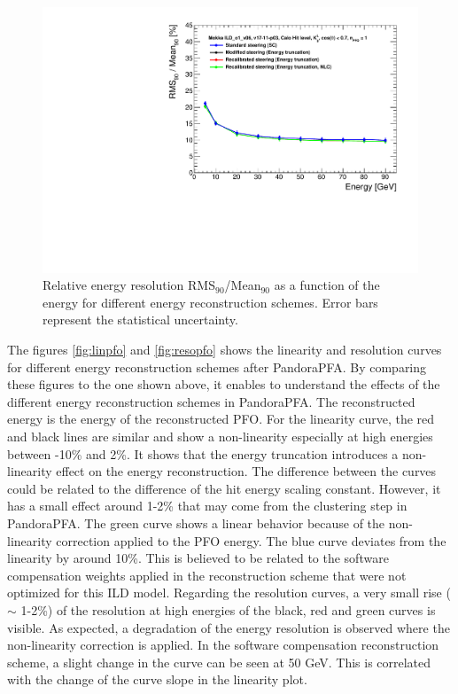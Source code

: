 \begin{figure}[htbp!]
  \centering
  \includegraphics[width=0.7\linewidth]{../Thesis_Plots/ILD/NoSmearing/Plots_Comparison/Comparison_resolution_Curves_Hits}
  \caption{Relative energy resolution RMS$_{90}$/Mean$_{90}$ as a function of the energy for different energy reconstruction schemes. Error bars represent the statistical uncertainty.} \label{fig:resohits}
\end{figure}

The figures \ref{fig:linpfo} and \ref{fig:resopfo} shows the linearity and resolution curves for different energy reconstruction schemes after PandoraPFA. By comparing these figures to the one shown above, it enables to understand the effects of the different energy reconstruction schemes in PandoraPFA. The reconstructed energy is the energy of the reconstructed PFO. For the linearity curve, the red and black lines are similar and show a non-linearity especially at high energies between -10\% and 2\%. It shows that the energy truncation introduces a non-linearity effect on the energy reconstruction. The difference between the curves could be related to the difference of the hit energy scaling constant. However, it has a small effect around 1-2\% that may come from the clustering step in PandoraPFA. The green curve shows a linear behavior because of the non-linearity correction applied to the PFO energy. The blue curve deviates from the linearity by around 10\%. This is believed to be related to the software compensation weights applied in the reconstruction scheme that were not optimized for this ILD model. Regarding the resolution curves, a very small rise ($\sim$ 1-2\%) of the resolution at high energies of the black, red and green curves is visible. As expected, a degradation of the energy resolution is observed where the non-linearity correction is applied. In the software compensation reconstruction scheme, a slight change in the curve can be seen at 50 GeV. This is correlated with the change of the curve slope in the linearity plot.

